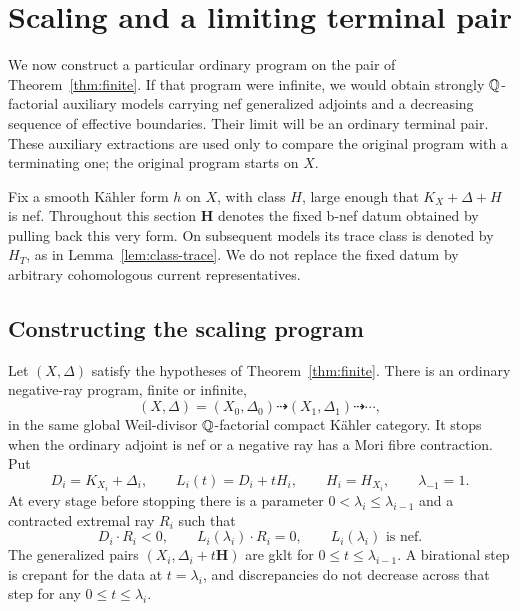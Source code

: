 \section{Scaling and a limiting terminal pair}\label{sec:scaling}

We now construct a particular ordinary program on the pair of
Theorem~\ref{thm:finite}.  If that program were infinite, we would obtain
strongly \(\mathbb Q\)-factorial auxiliary models carrying nef generalized
adjoints and a decreasing sequence of effective boundaries.  Their limit
will be an ordinary terminal pair.  These auxiliary extractions are used
only to compare the original program with a terminating one; the
original program starts on \(X\).

Fix a smooth Kähler form \(h\) on \(X\), with class \(H\), large enough
that \(K_X+\Delta+H\) is nef.  Throughout this section
\(\mathbf H\) denotes the fixed b-nef datum obtained by pulling back
this very form.  On subsequent models its trace class is denoted by
\(H_T\), as in Lemma~\ref{lem:class-trace}.  We do not replace the
fixed datum by arbitrary cohomologous current representatives.

\subsection{Constructing the scaling program}

\begin{proposition}\label{prop:scaling-construction}
Let \((X,\Delta)\) satisfy the hypotheses of Theorem~\ref{thm:finite}.
There is an ordinary negative-ray program, finite or infinite,
\[
 (X,\Delta)=(X_0,\Delta_0)\dashrightarrow
 (X_1,\Delta_1)\dashrightarrow\cdots,
\]
in the same global Weil-divisor \(\mathbb Q\)-factorial compact Kähler
category.  It stops when the ordinary adjoint is nef or a negative ray
has a Mori fibre contraction.  Put
\[
 D_i=K_{X_i}+\Delta_i,\qquad
 L_i(t)=D_i+tH_i,\qquad H_i=H_{X_i},\qquad \lambda_{-1}=1.
\]
At every stage before stopping there is a parameter
\(0<\lambda_i\leq\lambda_{i-1}\) and a contracted extremal ray
\(R_i\) such that
\[
 D_i\cdot R_i<0,\qquad L_i(\lambda_i)\cdot R_i=0,
 \qquad L_i(\lambda_i)\text{ is nef}.
\]
The generalized pairs \((X_i,\Delta_i+t\mathbf H)\) are gklt for
\(0\leq t\leq\lambda_{i-1}\).  A birational step is crepant for the
data at \(t=\lambda_i\), and discrepancies do not decrease across
that step for any \(0\leq t\leq\lambda_i\).
\end{proposition}

